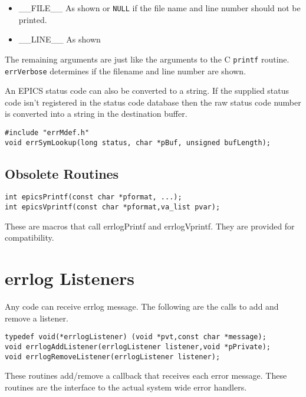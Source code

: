 \begin{itemize}\item \_\_FILE\_\_   As shown or \verb|NULL| if the file name and line number should not be printed.

\item \_\_LINE\_\_  As shown

\end{itemize}The remaining arguments are just like the arguments to the C \verb|printf| routine. \verb|errVerbose| determines if the filename 
and line number are shown.

An EPICS status code can also be converted to a string. If the supplied status code isn't registered in the status code 
database then the raw status code number is converted into a string in the destination buffer.

\begin{verbatim}#include "errMdef.h"
void errSymLookup(long status, char *pBuf, unsigned bufLength);
\end{verbatim}\subsection{Obsolete Routines }

\begin{verbatim}int epicsPrintf(const char *pformat, ...);
int epicsVprintf(const char *pformat,va_list pvar);
\end{verbatim}
These are macros that call errlogPrintf and errlogVprintf. They are provided for compatibility.

\section{errlog Listeners}

Any code can receive errlog message. The following are the calls to add and remove a listener.

\begin{verbatim}
typedef void(*errlogListener) (void *pvt,const char *message);
void errlogAddListener(errlogListener listener,void *pPrivate);
void errlogRemoveListener(errlogListener listener);
\end{verbatim}
These routines add/remove a callback that receives each error message. These routines are the interface to the actual 
system wide error handlers.

